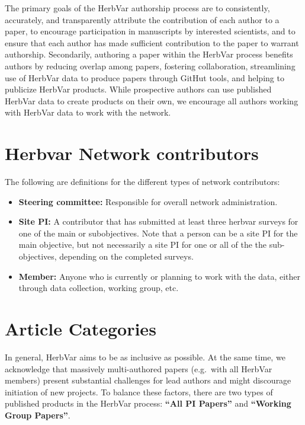 \documentclass[
  letterpaper,
  oneside,
  open=any]{scrbook}
\begin{document}
The primary goals of the HerbVar authorship process are to consistently,
accurately, and transparently attribute the contribution of each author
to a paper, to encourage participation in manuscripts by interested
scientists, and to ensure that each author has made sufficient
contribution to the paper to warrant authorship. Secondarily, authoring
a paper within the HerbVar process benefits authors by reducing overlap
among papers, fostering collaboration, streamlining use of HerbVar data
to produce papers through GitHut tools, and helping to publicize HerbVar
products. While prospective authors can use published HerbVar data to
create products on their own, we encourage all authors working with
HerbVar data to work with the network.

\section{Herbvar Network
contributors}\label{herbvar-network-contributors}

The following are definitions for the different types of network
contributors:

\begin{itemize}
\item
  \textbf{Steering committee:} Responsible for overall network
  administration.
\item
  \textbf{Site PI:} A contributor that has submitted at least three
  herbvar surveys for one of the main or subobjectives. Note that a
  person can be a site PI for the main objective, but not necessarily a
  site PI for one or all of the the sub-objectives, depending on the
  completed surveys.
\item
  \textbf{Member:} Anyone who is currently or planning to work with the
  data, either through data collection, working group, etc.
\end{itemize}

\section{Article Categories}\label{article-categories}

In general, HerbVar aims to be as inclusive as possible. At the same
time, we acknowledge that massively multi-authored papers (e.g.~with all
HerbVar members) present substantial challenges for lead authors and
might discourage initiation of new projects. To balance these factors,
there are two types of published products in the HerbVar process:
\textbf{``All PI Papers''} and \textbf{``Working Group Papers''}.
\end{document}
